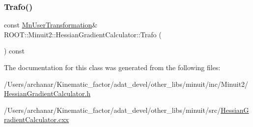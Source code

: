 \mbox{\label{classROOT_1_1Minuit2_1_1HessianGradientCalculator_a4b122eecb0217cab813601572ccbac74}} 
\subsubsection{\texorpdfstring{Trafo()}{Trafo()}\hspace{0.1cm}{\footnotesize\ttfamily [2/2]}}
{\footnotesize\ttfamily const \mbox{\hyperlink{classROOT_1_1Minuit2_1_1MnUserTransformation}{Mn\+User\+Transformation}}\& R\+O\+O\+T\+::\+Minuit2\+::\+Hessian\+Gradient\+Calculator\+::\+Trafo (\begin{DoxyParamCaption}{ }\end{DoxyParamCaption}) const\hspace{0.3cm}{\ttfamily [inline]}}



The documentation for this class was generated from the following files\+:\begin{DoxyCompactItemize}
\item 
/\+Users/archanar/\+Kinematic\+\_\+factor/adat\+\_\+devel/other\+\_\+libs/minuit/inc/\+Minuit2/\mbox{\hyperlink{other__libs_2minuit_2inc_2Minuit2_2HessianGradientCalculator_8h}{Hessian\+Gradient\+Calculator.\+h}}\item 
/\+Users/archanar/\+Kinematic\+\_\+factor/adat\+\_\+devel/other\+\_\+libs/minuit/src/\mbox{\hyperlink{HessianGradientCalculator_8cxx}{Hessian\+Gradient\+Calculator.\+cxx}}\end{DoxyCompactItemize}
